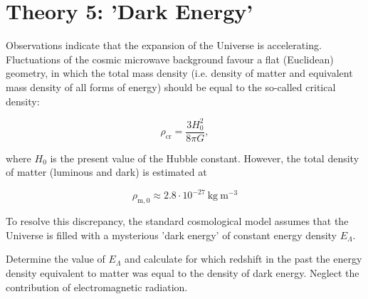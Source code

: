 \documentclass[10pt]{article}
\begin{document}
\section*{Theory 5: 'Dark Energy'}
Observations indicate that the expansion of the Universe is accelerating. Fluctuations of the cosmic microwave background favour a flat (Euclidean) geometry, in which the total mass density (i.e. density of matter and equivalent mass density of all forms of energy) should be equal to the so-called critical density:

$$
\rho_{\mathrm{cr}}=\frac{3 H_{0}^{2}}{8 \pi G},
$$

where $H_{0}$ is the present value of the Hubble constant. However, the total density of matter (luminous and dark) is estimated at

$$
\rho_{\mathrm{m}, 0} \approx 2.8 \cdot 10^{-27} \mathrm{~kg} \mathrm{~m}^{-3}
$$

To resolve this discrepancy, the standard cosmological model assumes that the Universe is filled with a mysterious 'dark energy' of constant energy density $E_{\Lambda}$.

Determine the value of $E_{\Lambda}$ and calculate for which redshift in the past the energy density equivalent to matter was equal to the density of dark energy. Neglect the contribution of electromagnetic radiation.\\
\end{document}
